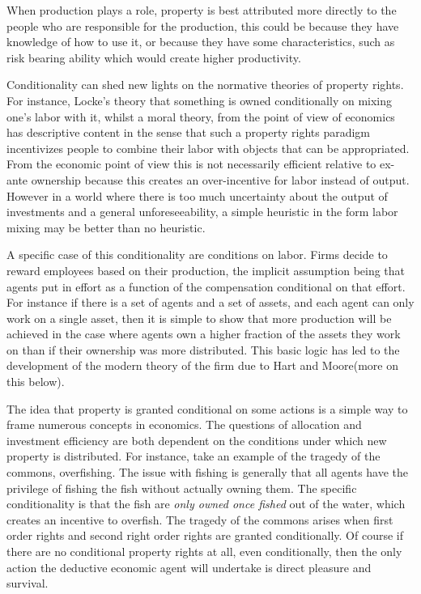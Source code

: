 \documentclass[12pt]{article}
\numberwithin{equation}{section}
\begin{document}
When production plays a role, property is best attributed more directly to the people who are responsible for the production, this could be because they have knowledge of how to use it, or because they have some characteristics, such as risk bearing ability which would create higher productivity.

Conditionality can shed new lights on the normative theories of property rights. For instance, Locke's theory that something is owned conditionally on mixing one's labor with it, whilst a moral theory, from the point of view of economics has descriptive content in the sense that such a property rights paradigm incentivizes people to combine their labor with objects that can be appropriated. From the economic point of view this is not necessarily efficient relative to ex-ante ownership because this creates an over-incentive for labor instead of output. However in a world where there is too much uncertainty about the output of investments and a general unforeseeability, a simple heuristic in the form labor mixing may be better than no heuristic.

A specific case of this conditionality are conditions on labor. Firms decide to reward employees based on their production, the implicit assumption being that agents put in effort as a function of the compensation conditional on that effort. For instance if there is a set of agents and a set of assets, and each agent can only work on a single asset, then it is simple to show that more production will be achieved in the case where agents own a higher fraction of the assets they work on than if their ownership was more distributed. This basic logic has led to the development of the modern theory of the firm due to Hart and Moore(more on this below).

The idea that property is granted conditional on some actions is a simple way to frame numerous concepts in economics. The questions of allocation and investment efficiency are both dependent on the conditions under which new property is distributed. For instance, take an example of the tragedy of the commons, overfishing. The issue with fishing is generally that all agents have the privilege of fishing the fish without actually owning them. The specific conditionality is that the fish are \textit{only owned once fished} out of the water, which creates an incentive to overfish. The tragedy of the commons arises when first order rights and second right order rights are granted conditionally. Of course if there are no conditional property rights at all, even conditionally, then the only action the deductive economic agent will undertake is direct pleasure and survival.
\end{document}
